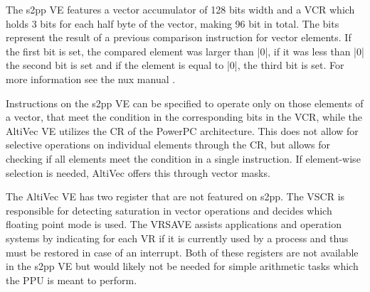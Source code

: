 {The \ac{s2pp} \ac{VE} features a vector accumulator of 128 bits width and a \ac{VCR} which holds 3 bits for each half byte of the vector, making 96 bit in total.
The bits represent the result of a previous comparison instruction for vector elements.
If the first bit is set, the compared element was larger than |0|, if it was less than |0| the second bit is set and if the element is equal to |0|, the third bit is set.
For more information see the nux manual \citep[p.~23]{nuxmanual}.

Instructions on the \ac{s2pp} \ac{VE} can be specified to operate only on those elements of a vector, that meet the condition in the corresponding bits in the \ac{VCR}, while the AltiVec \ac{VE} utilizes the \ac{CR} of the PowerPC architecture.
This does not allow for selective operations on individual elements through the \ac{CR}, but allows for checking if all elements meet the condition in a single instruction.
If element-wise selection is needed, AltiVec offers this through vector masks.
    
The AltiVec \ac{VE} has two register that are not featured on \ac{s2pp}.
The \ac{VSCR} is responsible for detecting saturation in vector operations and decides which floating point mode is used.
The \ac{VRSAVE} assists applications and operation systems by indicating for each \ac{VR} if it is currently used by a process and thus must be restored in case of an interrupt.
Both of these registers are not available in the \ac{s2pp} \ac{VE} but would likely not be needed for simple arithmetic tasks which the \ac{PPU} is meant to perform.

}
